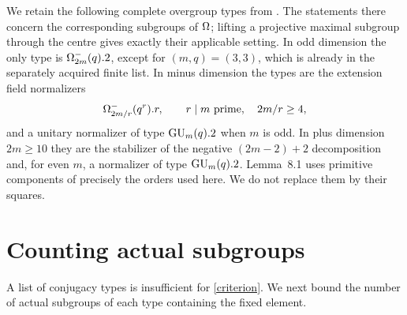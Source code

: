 \documentclass[11pt,a4paper]{article}
\begin{document}
We retain the following complete overgroup types from
\cite[Lemmas~6.1,7.3,8.1]{BSW}. The statements there concern the
corresponding subgroups of $\Omega$; lifting a projective maximal subgroup
through the centre gives exactly their applicable setting.
In odd dimension the only type is $\Omega^-_{2m}(q).2$, except for
$(m,q)=(3,3)$, which is already in the separately acquired finite list.
In minus dimension the types are the extension field normalizers
\[
       \Omega^-_{2m/r}(q^r).r,
       \qquad r\mid m\text{ prime},\quad 2m/r\ge4,
\]
and a unitary normalizer of type $\operatorname{GU}_m(q).2$ when $m$ is odd.
In plus dimension $2m\ge10$ they are the stabilizer of the negative
$(2m-2)+2$ decomposition and, for even $m$, a normalizer of type
$\operatorname{GU}_m(q).2$. Lemma~8.1 uses primitive components of precisely the
orders used here. We do not replace them by their squares.

\section{Counting actual subgroups}
A list of conjugacy types is insufficient for \eqref{criterion}.
We next bound the number of actual subgroups of each type containing
the fixed element.
\end{document}

